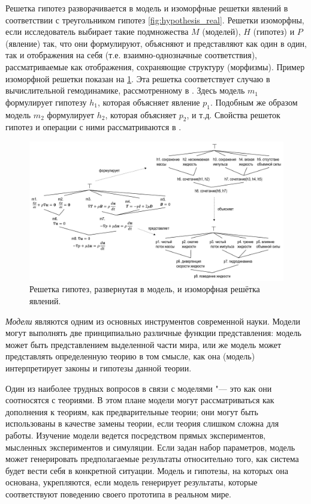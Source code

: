 Решетка гипотез разворачивается в модель и изоморфные решетки явлений в соответствии с треугольником 
гипотез \cref{fig:hypothesis_real}. Решетки изоморфны, если исследователь выбирает такие подмножества $M$ (моделей), 
$H$ (гипотез) и $P$ (явление) так, что они формулируют, объясняют и представляют как один в один, так и отображения 
на себя (т.е. взаимно-однозначные соответствия), рассматриваемые как отображения, сохраняющие структуру (морфизмы). 
Пример изоморфной решетки показан на \cref{fig:lattice_fluid}. Эта решетка соответствует случаю в вычислительной 
гемодинамике, рассмотренному в \cite{Goncalves2013}. Здесь модель $m_1$ формулирует гипотезу $h_1$, которая объясняет 
явление $p_1$. Подобным же образом модель $m_2$ формулирует $h_2$, которая объясняет $p_2$, и т.д. Свойства решеток 
гипотез и операции с ними рассматриваются в \cite{Goncalves2012}.

\begin{figure}[ht]
    \centering
    \includegraphics[width=1.0\linewidth]{images/lattice_fluid.pdf}
    \caption{Решетка гипотез, развернутая в модель, и изоморфная решётка явлений.}\label{fig:lattice_fluid}
\end{figure}

\textit{Модели} являются одним из основных инструментов современной науки. Модели могут выполнять две принципиально 
различные функции представления: модель может быть представлением выделенной части мира, или же модель может 
представлять определенную теорию в том смысле, как она (модель) интерпретирует законы и гипотезы данной теории.

Один из наиболее трудных вопросов в связи с моделями "--- это как они соотносятся с теориями. В этом плане модели 
могут рассматриваться как дополнения к теориям, как предварительные теории; они могут быть использованы в качестве 
замены теории, если теория слишком сложна для работы. Изучение модели ведется посредством прямых экспериментов, 
мысленных экспериментов и симуляции. Если задан набор параметров, модель может генерировать предполагаемые результаты 
относительно того, как система будет вести себя в конкретной ситуации. Модель и гипотезы, на которых она основана, 
укрепляются, если модель генерирует результаты, которые соответствуют поведению своего прототипа в реальном мире. 

